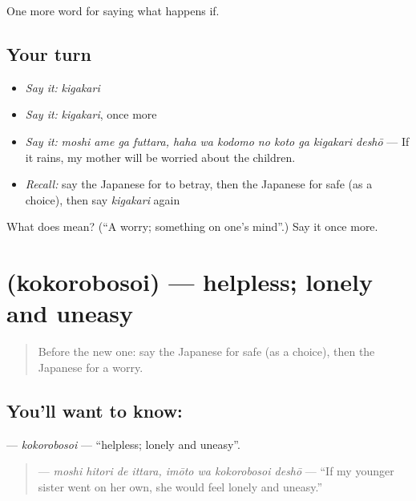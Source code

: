 \begin{grammarlens}[title={What you've built}]
One more word for saying what happens if.
\end{grammarlens}

\subsection*{Your turn}
\begin{itemize}
\raggedright
  \item \emph{Say it:} \emph{kigakari}
  \item \emph{Say it:} \emph{kigakari}, once more
  \item \emph{Say it:} \emph{moshi ame ga futtara, haha wa kodomo no koto ga kigakari deshō} — If it rains, my mother will be worried about the children.
  \item \emph{Recall:} say the Japanese for to betray, then the Japanese for safe (as a choice), then say \emph{kigakari} again
\end{itemize}

\begin{tcolorbox}[breakable,colback=teal!4,colframe=teal!35!black,title={Before you move on}]
What does  mean? (\textquotedblleft{}A worry; something on one's mind\textquotedblright{}.) Say it once more.
\end{tcolorbox}
\section[\texorpdfstring{\ja{こころぼそい} (kokorobosoi)}{こころぼそい (kokorobosoi)}]{ (kokorobosoi) — helpless; lonely and uneasy}

\label{lesson:JA-C520-kokorobosoi}



\begin{quote}
Before the new one: say the Japanese for safe (as a choice), then the Japanese for a worry.
\end{quote}

\subsection*{You'll want to know: }
\textbf{} — \emph{kokorobosoi} — \textquotedblleft{}helpless; lonely and uneasy\textquotedblright{}.

\begin{quote}
\textbf{   } — \emph{moshi hitori de ittara, imōto wa kokorobosoi deshō} — \textquotedblleft{}If my younger sister went on her own, she would feel lonely and uneasy.\textquotedblright{}
\end{quote}

